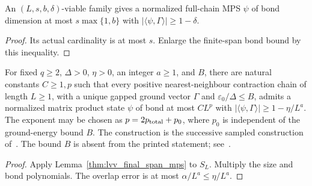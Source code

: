 \begin{lemma}
    \label{thm:lvv_final_viable_mps}
    \leanok
    An $(L,s,b,\delta)$-viable family gives a normalized full-chain MPS
    $\psi$ of bond dimension at most $s\max\{1,b\}$ with
    $|\langle\psi,\Gamma\rangle|\ge1-\delta$.
\end{lemma}
\begin{proof}
    \leanok
    Its actual cardinality is at most $s$. Enlarge the finite-span bond bound
    by this inequality.
\end{proof}

\begin{theorem}
    \label{thm:lvv_sampled_ground_state}
    \leanok
    For fixed $q\ge2$, $\Delta>0$, $\eta>0$, an integer $a\ge1$, and $B$, there are natural
    constants $C\ge1,p$ such that every positive nearest-neighbour
    contraction chain of length $L\ge1$, with a unique gapped ground vector
    $\Gamma$ and $\varepsilon_0/\Delta\le B$, admits a normalized matrix
    product state $\psi$ of bond at most $CL^p$ with
    $|\langle\psi,\Gamma\rangle|\ge1-\eta/L^a$.
    The exponent may be chosen as $p=2p_{\rm total}+p_0$, where $p_0$ is
    independent of the ground-energy bound $B$.
    The construction is the successive sampled construction
    of~\cite{Landau2015Polynomial}. The bound $B$ is absent from the printed
    statement; see~\cite{gap:lvv13_runtime_ground_energy}.
\end{theorem}
\begin{proof}
    \leanok
    Apply Lemma~\ref{thm:lvv_final_span_mps} to $S_L$.
    Multiply the size and bond polynomials. The overlap error is at most
    $\alpha/L^a\le\eta/L^a$.
\end{proof}
